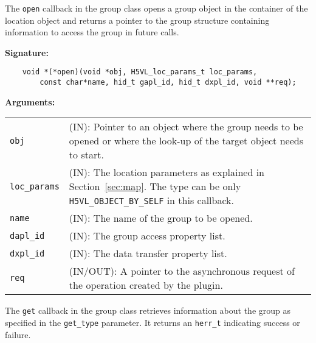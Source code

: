 The \texttt{open} callback in the group class opens a group object
in the container of the location object and returns a pointer to the
group structure containing information to access the group in future
calls.\bigskip

\begin{mdframed}[style=bgbox]
\textbf{Signature:}
\begin{lstlisting}
    void *(*open)(void *obj, H5VL_loc_params_t loc_params, 
        const char*name, hid_t gapl_id, hid_t dxpl_id, void **req);
\end{lstlisting}

\textbf{Arguments:}\\
\begin{tabular}{l p{13.5cm}}
  \texttt{obj} & (IN): Pointer to an object where the group needs to be
  opened or where the look-up of the target object needs to start.\\
  \texttt{loc\_params} & (IN): The location parameters as explained in
  Section~\ref{sec:map}. The type can be only \texttt{H5VL\_OBJECT\_BY\_SELF} in this callback. \\
  \texttt{name} & (IN): The name of the group to be opened.\\
  \texttt{dapl\_id} & (IN): The group access property list.\\
  \texttt{dxpl\_id} & (IN): The data transfer property list.\\
  \texttt{req} & (IN/OUT): A pointer to the asynchronous request of the
  operation created by the plugin.\\
\end{tabular}
\end{mdframed}

The \texttt{get} callback in the group class retrieves information
about the group as specified in the \texttt{get\_type} parameter. It
returns an \texttt{herr\_t} indicating success or failure.\bigskip


